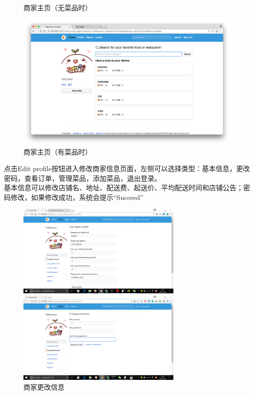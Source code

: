 \documentclass[12pt, oneside,a4paper]{article}
\begin{document}
\begin{itemize}
\begin{figure}[H]
     \caption{\small{商家主页（无菜品时）}}
  \end{figure}
  \begin{figure}[H]
   \centering
     \includegraphics[width=6.00in]{re-home2.jpg}
     \caption{\small{商家主页（有菜品时）}}
  \end{figure}
  点击Edit profile按钮进入修改商家信息页面，左侧可以选择类型：基本信息，更改密码，查看订单，管理菜品，添加菜品，退出登录。\\
  基本信息可以修改店铺名、地址、配送费、起送价、平均配送时间和店铺公告；密码修改，如果修改成功，系统会提示“Succeed”
  \begin{figure}[H]
   \begin{minipage}[t]{0.5\linewidth}
    \centering
     \includegraphics[width=3.2in]{re-profile.jpg}
     \caption{\small{商家更改信息}}
   \end{minipage}
   \begin{minipage}[t]{0.5\linewidth}
    \centering
     \includegraphics[width=3.2in]{re-password.jpg}

\end{minipage}
\end{figure}
\end{itemize}
\end{document}

